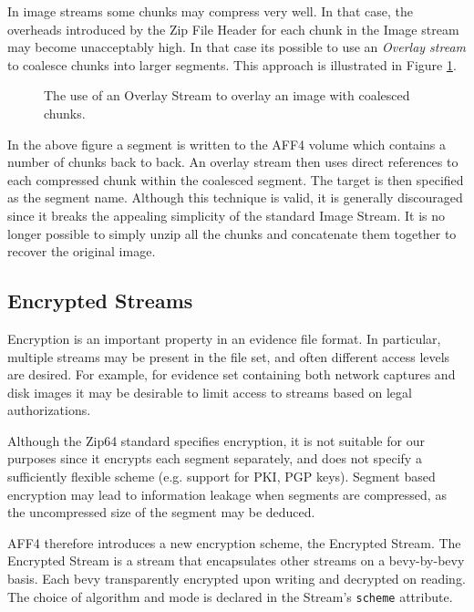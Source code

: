 \documentclass[10pt, conference]{IEEEtran}
\begin{document}
In image streams some chunks may compress very well. In that case, the
overheads introduced by the Zip File Header for each chunk in the
Image stream may become unacceptably high. In that case its possible
to use an {\em Overlay stream} to coalesce chunks into larger
segments. This approach is illustrated in Figure \ref{overlay}.

\begin{figure}[tb]
  \begin{center}
  \mbox{\columnwidth {}}
  \caption{The use of an Overlay Stream to overlay an image with
coalesced chunks.}
  \label{overlay}
  \end{center}
\end{figure}

In the above figure a segment is written to the AFF4 volume which
contains a number of chunks back to back. An overlay stream then uses
direct references to each compressed chunk within the coalesced
segment. The target is then specified as the segment name. Although
this technique is valid, it is generally discouraged since it breaks
the appealing simplicity of the standard Image Stream.  It is no
longer possible to simply unzip all the chunks and concatenate them
together to recover the original image.



\subsection{Encrypted Streams}
Encryption is an important property in an evidence file format. In
particular, multiple streams may be present in the file set, and often
different access levels are desired. For example, for evidence set
containing both network captures and disk images it may be desirable
to limit access to streams based on legal authorizations.

Although the Zip64 standard specifies encryption, it is not suitable
for our purposes since it encrypts each segment separately, and does
not specify a sufficiently flexible scheme (e.g. support for PKI, PGP
keys). Segment based encryption may lead to information leakage when
segments are compressed, as the uncompressed size of the segment may
be deduced.

AFF4 therefore introduces a new encryption scheme, the Encrypted
Stream.  The Encrypted Stream is a stream that encapsulates other
streams on a bevy-by-bevy basis. Each bevy transparently encrypted upon
writing and decrypted on reading. The choice of algorithm and mode is declared in the
Stream's \texttt{scheme} attribute. 
\end{document}
